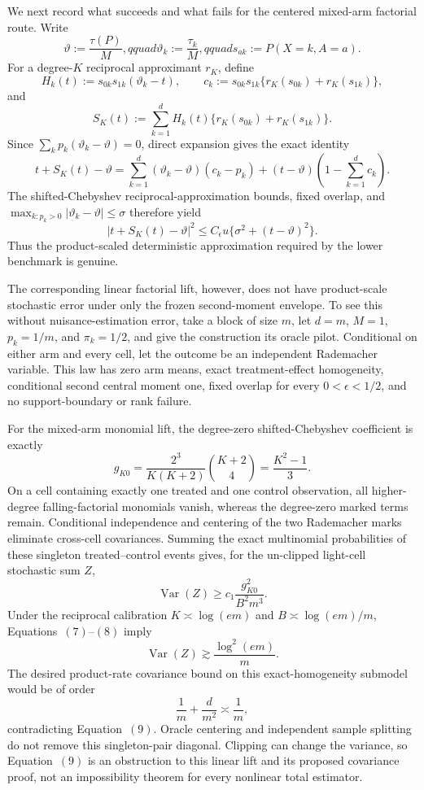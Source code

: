 We next record what succeeds and what fails for the centered mixed-arm factorial route.  Write
\[
 \vartheta:=\frac{\tau(P)}M,qquad
 \vartheta_k:=\frac{\tau_k}M,qquad
 s_{ak}:=P(X=k,A=a).
\]
For a degree-\(K\) reciprocal approximant \(r_K\), define
\[
 H_k(t):=s_{0k}s_{1k}(\vartheta_k-t),
 \qquad
 c_k:=s_{0k}s_{1k}\{r_K(s_{0k})+r_K(s_{1k})\},
\]
and
\[
 S_K(t):=\sum_{k=1}^d
 H_k(t)\{r_K(s_{0k})+r_K(s_{1k})\}.
\]
Since \(\sum_kp_k(\vartheta_k-\vartheta)=0\), direct expansion gives the exact identity
\[
 t+S_K(t)-\vartheta
 =\sum_{k=1}^d(\vartheta_k-\vartheta)(c_k-p_k)
 +(t-\vartheta)\left(1-\sum_{k=1}^dc_k\right).
\tag{5}
\]
The shifted-Chebyshev reciprocal-approximation bounds, fixed overlap, and
\(\max_{k:p_k>0}|\vartheta_k-\vartheta|\le\sigma\) therefore yield
\[
 |t+S_K(t)-\vartheta|^2
 \le C_{\epsilon}u\{\sigma^2+(t-\vartheta)^2\}.
\tag{6}
\]
Thus the product-scaled deterministic approximation required by the lower benchmark is genuine.

The corresponding linear factorial lift, however, does not have product-scale stochastic error under only the frozen second-moment envelope.  To see this without nuisance-estimation error, take a block of size \(m\), let \(d=m\), \(M=1\), \(p_k=1/m\), and \(\pi_k=1/2\), and give the construction its oracle pilot.  Conditional on either arm and every cell, let the outcome be an independent Rademacher variable.  This law has zero arm means, exact treatment-effect homogeneity, conditional second central moment one, fixed overlap for every \(0<\epsilon<1/2\), and no support-boundary or rank failure.

For the mixed-arm monomial lift, the degree-zero shifted-Chebyshev coefficient is exactly
\[
 g_{K0}
 =\frac{2^3}{K(K+2)}\binom{K+2}{4}
 =\frac{K^2-1}{3}.
\tag{7}
\]
On a cell containing exactly one treated and one control observation, all higher-degree falling-factorial monomials vanish, whereas the degree-zero marked terms remain.  Conditional independence and centering of the two Rademacher marks eliminate cross-cell covariances.  Summing the exact multinomial probabilities of these singleton treated--control events gives, for the un-clipped light-cell stochastic sum \(Z\),
\[
 \operatorname{Var}(Z)
 \ge c_1\frac{g_{K0}^2}{B^2m^3}.
\tag{8}
\]
Under the reciprocal calibration \(K\asymp\log(em)\) and \(B\asymp\log(em)/m\), Equations~\((7)\)--\((8)\) imply
\[
 \operatorname{Var}(Z)
 \gtrsim \frac{\log^2(em)}m.
\tag{9}
\]
The desired product-rate covariance bound on this exact-homogeneity submodel would be of order
\[
 \frac1m+\frac d{m^2}\asymp\frac1m,
\]
contradicting Equation~\((9)\).  Oracle centering and independent sample splitting do not remove this singleton-pair diagonal.  Clipping can change the variance, so Equation~\((9)\) is an obstruction to this linear lift and its proposed covariance proof, not an impossibility theorem for every nonlinear total estimator.

